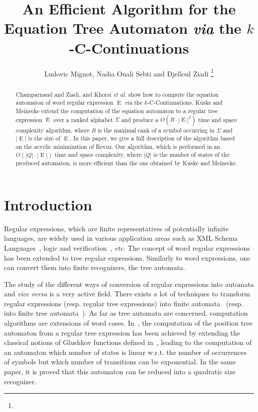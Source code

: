 \documentclass{llncs}
\DeclareMathOperator{\E}{E}
\begin{document}
\title{An Efficient Algorithm for the Equation Tree Automaton \emph{via} the $k$-C-Continuations}
\author{Ludovic Mignot, Nadia Ouali Sebti and Djelloul Ziadi  \thanks{}}



\maketitle

\begin{abstract}
  Champarnaud and Ziadi, and Khorsi \emph{et al.} show how to compute the equation automaton of word regular expression $\E$ \emph{via} the $k$-C-Continuations.
  Kuske and Meinecke extend the computation of the equation automaton to a regular tree expression $\E$ over a ranked alphabet $\Sigma$ and produce a $O(R\cdot|\E|^2)$ time and space complexity algorithm, where $R$ is the maximal rank of a symbol  occurring  in $\Sigma$ and $|\E|$ is the size of $\E$. In this paper, we give a full description of the algorithm based on the acyclic minimization of Revuz. Our algorithm, which is performed in an $O(|Q|\cdot|\E|)$ time and space complexity, where $|Q|$ is the number of states of the produced automaton, is more efficient than the one obtained by Kuske and Meinecke.
\end{abstract}

\section{Introduction}

Regular expressions, which are finite representatives of potentially infinite languages, are widely used in various application areas such as XML Schema Languages~\cite{xml}, logic and verification~\cite{verif}, \emph{etc.} The concept of word regular expressions  has been extended to tree regular expressions. Similarly to word expressions, one can convert them into  finite recognizers, the tree automata.
 
 The study of the different  ways of conversion of regular expressions into automata and \emph{vice versa} is a very  active  field. There exists a lot  of techniques to transform regular expressions (resp. regular tree expressions)  into finite automata~\cite{Brug,glushkov,khorsi,ZPC} (resp. into finite tree automata~\cite{automate2,lata}). As far as tree automata are concerned, computation algorithms are extensions of word cases. In~\cite{lata}, the computation of the position tree automaton from  a regular tree expression has been achieved by extending the classical notions of Glushkov functions defined  in~\cite{glushkov}, leading to the computation of an automaton which number of states is linear w.r.t. the number of  occurrences of symbols but which number of transitions can be exponential. In the same paper, it is proved that this automaton can be reduced  into a quadratic size recognizer.
 
\end{document}
